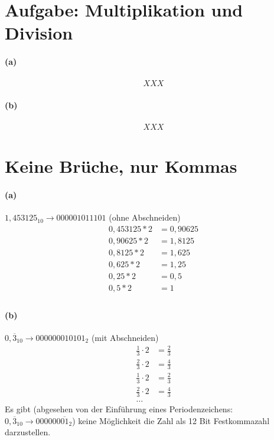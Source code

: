 \documentclass[a4paper]{article}
\begin{document}
\section{Aufgabe: Multiplikation und Division}
\paragraph{(a)}
\begin{align*}
XXX
\end{align*}
\paragraph{(b)}
\begin{align*}
XXX
\end{align*}


\section{Keine Brüche, nur Kommas}
\paragraph{(a)}
$1,453125_{10}\rightarrow 000001011101$ (ohne Abschneiden)
\begin{align*}
	0,453125 * 2 &= 0,90625 \\
	0,90625 * 2 &= 1,8125 \\
	0,8125 * 2 &= 1,625 \\
	0,625 * 2 &= 1,25 \\
	0,25 * 2 &= 0,5 \\
	0,5 * 2 &= 1 \\
\end{align*}
\paragraph{(b)}
$0,\overline{3}_{10}\rightarrow 000000010101_{2}$ (mit Abschneiden)
\begin{align*}
	\frac{1}{3}\cdot 2 &= \frac{2}{3} \\
	\frac{2}{3}\cdot 2 &= \frac{4}{3} \\
	\frac{1}{3}\cdot 2 &= \frac{2}{3} \\
	\frac{2}{3}\cdot 2 &= \frac{4}{3} \\
	\text{\ldots}
\end{align*}
Es gibt (abgesehen von der Einführung eines Periodenzeichens: $0,\overline{3}_{10}\rightarrow 000000\overline{01}_{2}$) keine Möglichkeit die Zahl als 12 Bit Festkommazahl darzustellen.
\end{document}
